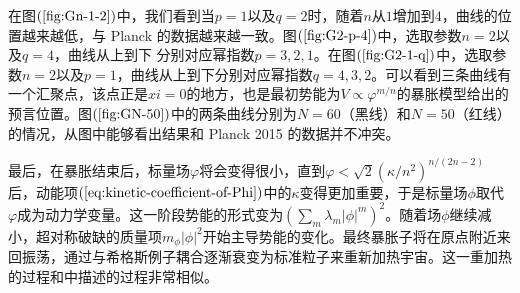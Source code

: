 在图$(\ref{fig:Gn-1-2})$中，我们看到当$p=1$以及$q=2$时，随着$n$从$1$增加到$4$，曲线的位置越来越低，与
Planck
的数据越来越一致。图$(\ref{fig:G2-p-4})$中，选取参数$n=2$以及$q=4$，曲线从上到下
分别对应幂指数$p=3,2,1$。在图$(\ref{fig:G2-1-q})$中，选取参数$n=2$以及$p=1$，曲线从上到下分别对应幂指数$q=4,3,2$。可以看到三条曲线有一个汇聚点，该点正是$xi=0$的地方，也是最初势能为$V\propto
\varphi^{m
/n}$的暴胀模型给出的预言位置。图$(\ref{fig:GN-50})$中的两条曲线分别为$N=60$（黑线）和$N=50$（红线）的情况，从图中能够看出结果和
Planck 2015 的数据并不冲突。

最后，在暴胀结束后，标量场$\varphi$将会变得很小，直到$\varphi <
\sqrt{2}{\left(\kappa /n^2\right)}^{n
/(2n-2)}$后，动能项$(\ref{eq:kinetic-coefficient-of-Phi})$中的$\kappa$变得更加重要，于是标量场$\phi$取代$\varphi$成为动力学变量。这一阶段势能的形式变为${\left(\sum_m
\lambda_m \left\lvert
\phi\right\rvert^{m}\right)}^2$。随着场$\phi$继续减小，超对称破缺的质量项$m_{\phi}\left\lvert\phi\right\rvert^2$开始主导势能的变化。最终暴胀子将在原点附近来回振荡，通过与希格斯例子耦合逐渐衰变为标准粒子来重新加热宇宙。这一重加热的过程和\citep{nakayama2010running}中描述的过程非常相似。
